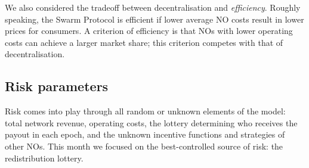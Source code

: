We also considered the tradeoff between decentralisation and \emph{efficiency}.
%
Roughly speaking, the Swarm Protocol is efficient if lower average NO costs result in lower prices for consumers.
%
A criterion of efficiency is that NOs with lower operating costs can achieve a larger market share; this criterion competes with that of decentralisation.

\begin{comment}
\subsubsection*{List of objectives}

Here are the revised candidate objectives for the NO incentive system:

\begin{enumerate}
  \item \emph{Incentivise service provision.} See above.
  \item \emph{Sybil resistance.} See August report.
  \item \emph{Penalising safety replication failures.} Nodes that fail to report storage proofs for the ``correct'' set of chunks for their neighbourhood should be penalised by having their stake slashed and hence their authorisation to participate in redistribution revoked.
  
  Replication failures are a failure of consensus, hence arguably a type of \emph{safety fault}, not a liveness fault as indicated in last month's report.
  However, the replication consensus system itself is 

  \item \emph{Limited returns to operator scale.} See above.
  \item \emph{Create or accentuate demand pressure for BZZ token.} See August report.
\end{enumerate}
\end{comment}

\subsection*{Risk parameters}

Risk comes into play through all random or unknown elements of the model: total network revenue, operating costs, the lottery determining who receives the payout in each epoch, and the unknown incentive functions and strategies of other NOs.
%
This month we focused on the best-controlled source of risk: the redistribution lottery.

